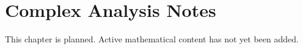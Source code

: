 
\section{Complex Analysis Notes}
\begin{remark*}[Status]
This chapter is planned. Active mathematical content has not yet been added.
\end{remark*}
